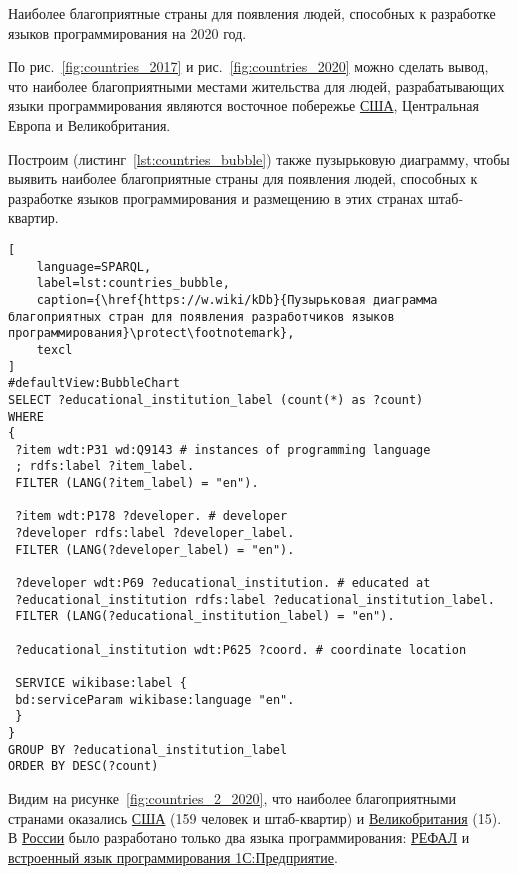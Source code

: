 \pagebreak

\begin{marginfigure}
{
\setlength{\fboxsep}{0pt}%
\setlength{\fboxrule}{1pt}%
}
  \caption{Наиболее благоприятные страны для появления людей, способных к разработке языков программирования на 2020 год.}%
  \label{fig:countries_2_2020}%
\end{marginfigure}
По  рис.~\ref{fig:countries_2017} и рис.~\ref{fig:countries_2020} можно сделать вывод, что наиболее благоприятными местами жительства для людей, разрабатывающих языки программирования являются восточное побережье \href{https://en.wikipedia.org/wiki/USA}{США}, Центральная Европа и Великобритания.

Построим (листинг~\ref{lst:countries_bubble}) также пузырьковую диаграмму, чтобы выявить наиболее благоприятные страны для появления людей, способных к разработке языков программирования и размещению в этих странах штаб-квартир. 
\begin{lstlisting}[
	language=SPARQL,
	label=lst:countries_bubble,
	caption={\href{https://w.wiki/kDb}{Пузырьковая диаграмма благоприятных стран для появления разработчиков языков программирования}\protect\footnotemark},
	texcl
]
#defaultView:BubbleChart
SELECT ?educational_institution_label (count(*) as ?count)
WHERE
{
 ?item wdt:P31 wd:Q9143 # instances of programming language
 ; rdfs:label ?item_label. 
 FILTER (LANG(?item_label) = "en"). 
 
 ?item wdt:P178 ?developer. # developer
 ?developer rdfs:label ?developer_label. 
 FILTER (LANG(?developer_label) = "en"). 
 	
 ?developer wdt:P69 ?educational_institution. # educated at
 ?educational_institution rdfs:label ?educational_institution_label. 
 FILTER (LANG(?educational_institution_label) = "en").
 
 ?educational_institution wdt:P625 ?coord. # coordinate location
 
 SERVICE wikibase:label {
 bd:serviceParam wikibase:language "en".
 } 	
}
GROUP BY ?educational_institution_label
ORDER BY DESC(?count)
\end{lstlisting}

Видим на рисунке~\ref{fig:countries_2_2020}, что наиболее благоприятными странами оказались \href{https://en.wikipedia.org/wiki/USA}{США} (159 человек и штаб-квартир) и \href{https://ru.wikipedia.org/wiki/Великобритания}{Великобритания} (15). В \href{https://en.wikipedia.org/wiki/Russia}{России} было разработано только два языка программирования: \href{https://www.wikidata.org/wiki/Q2626418}{РЕФАЛ} и \href{https://www.wikidata.org/wiki/Q65065977}{встроенный язык программирования 1С:Предприятие}.

